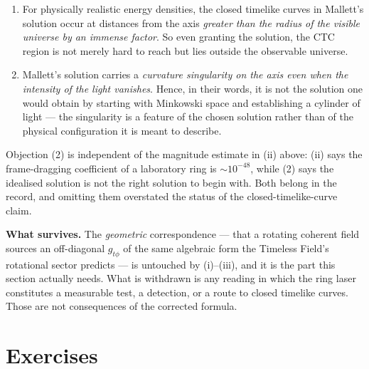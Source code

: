 \begin{remark}
\begin{enumerate}
\item For physically realistic energy densities, the closed timelike curves in
  Mallett's solution occur at distances from the axis \emph{greater than the
  radius of the visible universe by an immense factor}. So even granting the
  solution, the CTC region is not merely hard to reach but lies outside the
  observable universe.
\item Mallett's solution carries a \emph{curvature singularity on the axis even
  when the intensity of the light vanishes}. Hence, in their words, it is not the
  solution one would obtain by starting with Minkowski space and establishing a
  cylinder of light --- the singularity is a feature of the chosen solution
  rather than of the physical configuration it is meant to describe.
\end{enumerate}

\noindent Objection (2) is independent of the magnitude estimate in (ii) above:
(ii) says the frame-dragging coefficient of a laboratory ring is $\sim10^{-48}$,
while (2) says the idealised solution is not the right solution to begin with.
Both belong in the record, and omitting them overstated the status of the
closed-timelike-curve claim.

\textbf{What survives.} The \emph{geometric} correspondence --- that a rotating
coherent field sources an off-diagonal $g_{t\phi}$ of the same algebraic form the
Timeless Field's rotational sector predicts --- is untouched by (i)--(iii), and it
is the part this section actually needs. What is withdrawn is any reading in which
the ring laser constitutes a measurable test, a detection, or a route to closed
timelike curves. Those are not consequences of the corrected formula.
\end{remark}

\section{Exercises}

